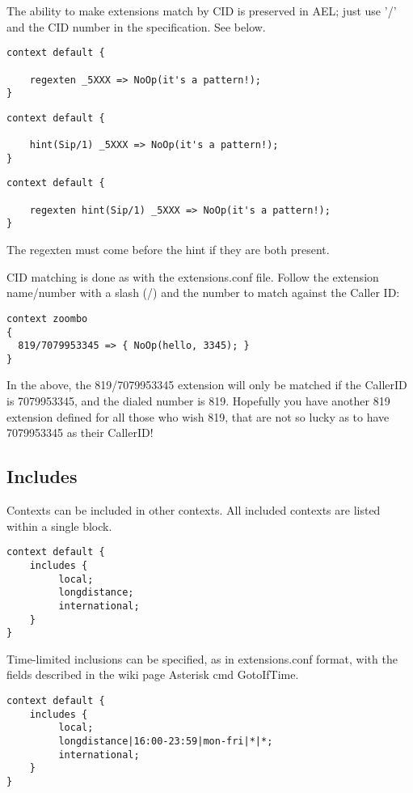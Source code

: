 {The ability to make extensions match by CID is preserved in
AEL; just use '/' and the CID number in the specification. See below.

\begin{verbatim}
context default {

    regexten _5XXX => NoOp(it's a pattern!);
}
\end{verbatim}

\begin{verbatim}
context default {

    hint(Sip/1) _5XXX => NoOp(it's a pattern!);
}
\end{verbatim}

\begin{verbatim}
context default {

    regexten hint(Sip/1) _5XXX => NoOp(it's a pattern!);
}
\end{verbatim}

The regexten must come before the hint if they are both present.

CID matching is done as with the extensions.conf file. Follow the extension
name/number with a slash (/) and the number to match against the Caller ID:

\begin{verbatim}
context zoombo
{
  819/7079953345 => { NoOp(hello, 3345); }
}
\end{verbatim}

In the above,  the 819/7079953345 extension will only be matched if the
CallerID is 7079953345, and the dialed number is 819. Hopefully you have
another 819 extension defined for all those who wish 819, that are not so lucky
as to have 7079953345 as their CallerID!


\subsection{Includes}

Contexts can be included in other contexts. All included contexts are
listed within a single block.

\begin{verbatim}
context default {
    includes {
         local;
         longdistance;
         international;
    }
}
\end{verbatim}

Time-limited inclusions can be specified, as in extensions.conf
format, with the fields described in the wiki page Asterisk cmd
GotoIfTime.

\begin{verbatim}
context default {
    includes {
         local;
         longdistance|16:00-23:59|mon-fri|*|*;
         international;
    }
}
\end{verbatim}

}
